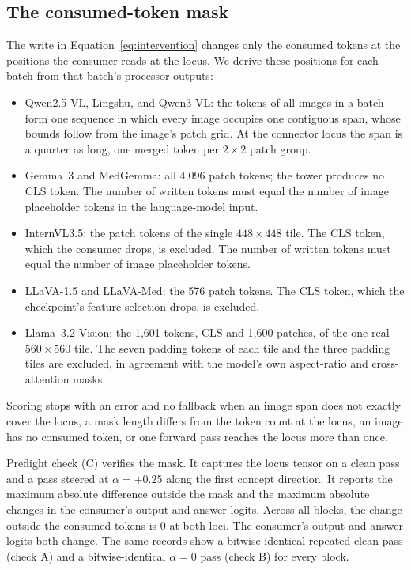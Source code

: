 \documentclass{article}
\begin{document}
\subsection{The consumed-token mask}
\label{app:repro-mask}

The write in Equation~\ref{eq:intervention} changes only the consumed tokens at the positions the consumer reads at the locus. We derive these positions for each batch from that batch's processor outputs:

\begin{itemize}[leftmargin=*,itemsep=1pt,topsep=2pt]
\item Qwen2.5-VL, Lingshu, and Qwen3-VL: the tokens of all images in a batch form one sequence in which every image occupies one contiguous span, whose bounds follow from the image's patch grid. At the connector locus the span is a quarter as long, one merged token per $2\times2$ patch group.
\item Gemma~3 and MedGemma: all 4{,}096 patch tokens; the tower produces no CLS token. The number of written tokens must equal the number of image placeholder tokens in the language-model input.
\item InternVL3.5: the patch tokens of the single $448\times448$ tile. The CLS token, which the consumer drops, is excluded. The number of written tokens must equal the number of image placeholder tokens.
\item LLaVA-1.5 and LLaVA-Med: the 576 patch tokens. The CLS token, which the checkpoint's feature selection drops, is excluded.
\item Llama~3.2 Vision: the 1{,}601 tokens, CLS and 1{,}600 patches, of the one real $560\times560$ tile. The seven padding tokens of each tile and the three padding tiles are excluded, in agreement with the model's own aspect-ratio and cross-attention masks.
\end{itemize}

Scoring stops with an error and no fallback when an image span does not exactly cover the locus, a mask length differs from the token count at the locus, an image has no consumed token, or one forward pass reaches the locus more than once.

Preflight check (C) verifies the mask. It captures the locus tensor on a clean pass and a pass steered at $\alpha=+0.25$ along the first concept direction. It reports the maximum absolute difference outside the mask and the maximum absolute changes in the consumer's output and answer logits. Across all \cfBlocks{} blocks, the change outside the consumed tokens is $0$ at both loci. The consumer's output and answer logits both change. The same records show a bitwise-identical repeated clean pass (check A) and a bitwise-identical $\alpha=0$ pass (check B) for every block.
\end{document}
